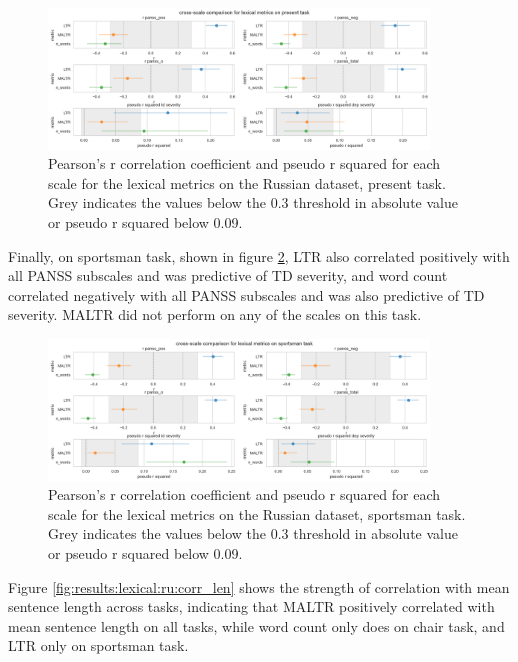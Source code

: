 \begin{figure}[ht!]
    \includegraphics[width=0.9\textwidth, center]{Figures/chapter_4/lexical/ru_present_scale_r.png} 
\captionsetup{width=\textwidth}
\caption[Lexical Metrics: Russian, Present Task]{\label{fig:results:lexical:ru:pr} Pearson's r correlation coefficient and pseudo r squared for each scale for the lexical metrics on the Russian dataset, present task. Grey indicates the values below the 0.3 threshold in absolute value or pseudo r squared below 0.09.}
\end{figure}

Finally, on sportsman task, shown in figure \ref{fig:results:lexical:ru:sp}, LTR also correlated positively with all PANSS subscales and was predictive of TD severity, and word count correlated negatively with all PANSS subscales and was also predictive of TD severity. MALTR did not perform on any of the scales on this task.

\begin{figure}[ht!]
    \includegraphics[width=0.9\textwidth, center]{Figures/chapter_4/lexical/ru_sportsman_scale_r.png} 
\captionsetup{width=\textwidth}
\caption[Lexical Metrics: Russian, Sportsman Task]{\label{fig:results:lexical:ru:sp} Pearson's r correlation coefficient and pseudo r squared for each scale for the lexical metrics on the Russian dataset, sportsman task. Grey indicates the values below the 0.3 threshold in absolute value or pseudo r squared below 0.09.}
\end{figure}

Figure \ref{fig:results:lexical:ru:corr_len} shows the strength of correlation with mean sentence length across tasks, indicating that MALTR positively correlated with mean sentence length on all tasks, while word count only does on chair task, and LTR only on sportsman task.

